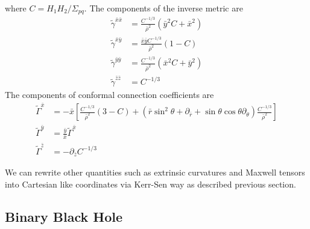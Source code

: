 \documentclass[%
 reprint,
 amsmath,amssymb,
 aps,
]{revtex4-1}
\begin{document}
where $C = H_1 H_2/\Sigma_{pq}$. The components of the inverse metric are
\begin{align}
\tilde{\gamma}^{\bar{x} \bar{x}} &=\frac{C^{-1/3}}{\bar{\rho}^2} (\bar{y}^2 C + \bar{x}^2) \\
\tilde{\gamma}^{\bar{x} \bar{y}} &=\frac{\bar{x} \bar{y} C^{-1/3}}{\bar{\rho}^2} (1- C) \\
\tilde{\gamma}^{\bar{y} \bar{y}} &=\frac{C^{-1/3}}{\bar{\rho}^2} (\bar{x}^2 C + \bar{y}^2)\\
\tilde{\gamma}^{\bar{z} \bar{z}} &=C^{-1/3}
\end{align}
The components of conformal connection coefficients are
\begin{align}
\tilde{\Gamma}^{\bar{x}} &= -\bar{x} \left[\frac{C^{-1/3}}{\bar{\rho}^2}(3-C) + (\bar{r} \sin^2 \theta + \partial_{\bar{r}} + \sin \theta \cos \theta \partial_\theta)\frac{C^{-1/3}}{\bar{\rho}^2} \right] \\
\tilde{\Gamma}^{\bar{y}} &= \frac{\bar{y}}{\bar{x}} \tilde{\Gamma}^{\bar{x}} \\
\tilde{\Gamma}^{\bar{z}} &= - \partial_{\bar{z}} C^{-1/3}
\end{align}


We can rewrite other quantities such as extrinsic curvatures and Maxwell tensors into Cartesian like coordinates via Kerr-Sen way as described previous section.





\subsection{Binary Black Hole}







\end{document}

